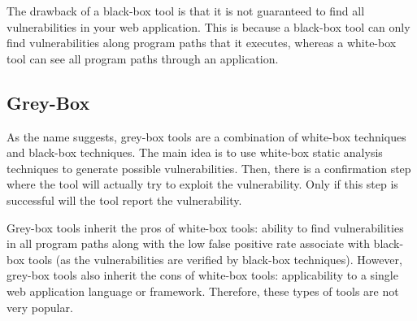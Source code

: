 The drawback of a black-box tool is that it is not guaranteed to find
all vulnerabilities in your web application. This is because a
black-box tool can only find vulnerabilities along program paths that
it executes, whereas a white-box tool can see all program paths
through an application. 

\subsection{Grey-Box}

As the name suggests, grey-box tools are a combination of white-box
techniques and black-box techniques. The main idea is to use white-box
static analysis techniques to generate possible vulnerabilities. Then,
there is a confirmation step where the tool will actually try to
exploit the vulnerability. Only if this step is successful will the
tool report the vulnerability.

Grey-box tools inherit the pros of white-box tools: ability to find
vulnerabilities in all program paths along with the low false positive
rate associate with black-box tools (as the vulnerabilities are
verified by black-box techniques). However, grey-box tools also
inherit the cons of white-box tools: applicability to a single web
application language or framework. Therefore, these types of tools are
not very popular.







